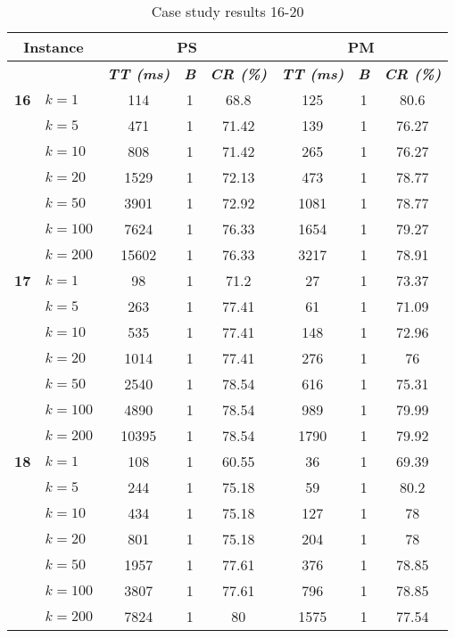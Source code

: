     \begin{table}[htbp]
    \caption{Case study results 16-20}
    \centering
    \begin{tabular}{|l|l|c|c|c|c|c|c|}
    \hline
    \multicolumn{ 2}{|c|}{\textbf{Instance}} & \multicolumn{ 3}{c|}{\textbf{PS}} & \multicolumn{ 3}{c|}{\textbf{PM}} \\ \hline
    \multicolumn{ 2}{|l|}{} & \textbf{\textit{TT (ms)}} & \textbf{\textit{B}} & \textbf{\textit{CR (\%)}} & \textbf{\textit{TT (ms)}} & \textbf{\textit{B}} & \textbf{\textit{CR (\%)}} \\ \hline
    \multicolumn{1}{|r|}{\textbf{16}} & $k=1$ & 114 & 1 & 68.8 & 125 & 1 & 80.6 \\ 
     & $k=5$ & 471 & 1 & 71.42 & 139 & 1 & 76.27 \\ 
     & $k=10$ & 808 & 1 & 71.42 & 265 & 1 & 76.27 \\ 
     & $k=20$ & 1529 & 1 & 72.13 & 473 & 1 & 78.77 \\ 
     & $k=50$ & 3901 & 1 & 72.92 & 1081 & 1 & 78.77 \\ 
     & $k=100$ & 7624 & 1 & 76.33 & 1654 & 1 & 79.27 \\ 
     & $k=200$ & 15602 & 1 & 76.33 & 3217 & 1 & 78.91 \\ \hline
    \multicolumn{1}{|r|}{\textbf{17}} & $k=1$ & 98 & 1 & 71.2 & 27 & 1 & 73.37 \\ 
     & $k=5$ & 263 & 1 & 77.41 & 61 & 1 & 71.09 \\ 
     & $k=10$ & 535 & 1 & 77.41 & 148 & 1 & 72.96 \\ 
     & $k=20$ & 1014 & 1 & 77.41 & 276 & 1 & 76 \\ 
     & $k=50$ & 2540 & 1 & 78.54 & 616 & 1 & 75.31 \\ 
     & $k=100$ & 4890 & 1 & 78.54 & 989 & 1 & 79.99 \\ 
     & $k=200$ & 10395 & 1 & 78.54 & 1790 & 1 & 79.92 \\ \hline
    \multicolumn{1}{|r|}{\textbf{18}} & $k=1$ & 108 & 1 & 60.55 & 36 & 1 & 69.39 \\ 
     & $k=5$ & 244 & 1 & 75.18 & 59 & 1 & 80.2 \\ 
     & $k=10$ & 434 & 1 & 75.18 & 127 & 1 & 78 \\ 
     & $k=20$ & 801 & 1 & 75.18 & 204 & 1 & 78 \\ 
     & $k=50$ & 1957 & 1 & 77.61 & 376 & 1 & 78.85 \\ 
     & $k=100$ & 3807 & 1 & 77.61 & 796 & 1 & 78.85 \\ 
     & $k=200$ & 7824 & 1 & 80 & 1575 & 1 & 77.54 \\ \hline

\end{tabular}
\end{table}
